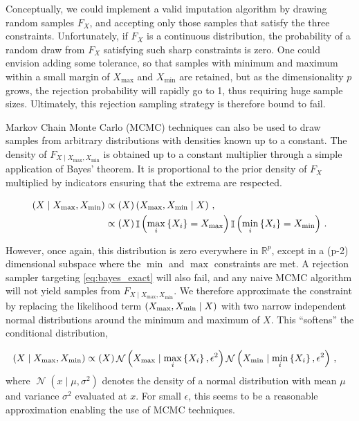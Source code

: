 \documentclass[letter]{article}
\newcommand{\genericdel}[3]{%
      \left#1#3\right#2
    }
\newcommand{\del}[1]{\genericdel(){#1}}
\newcommand{\cbr}[1]{\genericdel\{\}{#1}}
\let\Pr\relax
\DeclareMathOperator{\Pr}{\mathbb{P}}
\DeclareMathOperator{\Ind}{\mathbb{I}}
\DeclareMathOperator{\normal}{\mathcal{N}}
\newcommand{\Xmax}{X_{\max}}
\newcommand{\Xmin}{X_{\min}}
\newcommand{\Fcond}{F_{X \mid \Xmax,\Xmin}}
\newcommand{\eqlabel}[1]{\label{#1}}
\begin{document}
        Conceptually, we could implement a valid imputation algorithm by drawing random samples \(F_X\),
and accepting only those samples that satisfy the three constraints.
Unfortunately, if \(F_X\) is a continuous distribution, the probability of a random draw from \(F_X\) satisfying such sharp constraints is zero.
One could envision adding some tolerance, so that samples with minimum and maximum within a small margin of \(\Xmax\) and \(\Xmin\) are retained, but as the dimensionality \(p\) grows, the rejection probability will rapidly go to 1, thus requiring huge sample sizes.
Ultimately, this rejection sampling strategy is therefore bound to fail.
    


        Markov Chain Monte Carlo (MCMC) techniques can also be used to draw samples from arbitrary distributions with densities known up to a constant. The density of \(\Fcond\) is obtained up to a constant multiplier through a simple application of Bayes' theorem. It is proportional to the prior density of \(F_X\) multiplied by indicators ensuring that the extrema are respected.

\begin{equation}\begin{split}
    \Pr\del{X \mid \Xmax,\Xmin} &\propto \Pr\del{X} \Pr\del{\Xmax,\Xmin \mid X} \,, \\
           &\propto \Pr\del{X} \Ind\del{ \max_i\cbr{X_i} = \Xmax }\Ind\del{ \min_i\cbr{X_i} = \Xmin } \,.
\end{split}
\eqlabel{eq:bayes_exact}
\end{equation}

However, once again, this distribution is zero everywhere in \(\mathbb{R}^p\), except in a (p-2) dimensional subspace where the \(\min\) and \(\max\) constraints are met.
A rejection sampler targeting \eqref{eq:bayes_exact} will also fail, and any naive MCMC algorithm will not yield samples from \(\Fcond\).
We therefore approximate the constraint by replacing the likelihood term \(\Pr\del{\Xmax,\Xmin \mid X}\) with two narrow independent normal distributions around the minimum and maximum of \(X\).
This ``softens'' the conditional distribution,

\begin{equation}
\begin{split}
    \Pr\del{X \mid \Xmax,\Xmin} &\propto \Pr\del{X} 
                                         \normal\del{\Xmax \mid \max_i\cbr{X_i}, \epsilon^2}
                                         \normal\del{\Xmin \mid \min_i\cbr{X_i}, \epsilon^2}\,,
\end{split}
\eqlabel{eq:normal_lik}
\end{equation}
where \(\normal\del{x \mid \mu, \sigma^2}\) denotes the density of a normal distribution with mean \(\mu\) and variance \(\sigma^2\) evaluated at \(x\).
For small \(\epsilon\), this seems to be a reasonable approximation enabling the use of MCMC techniques.
    
\end{document}
